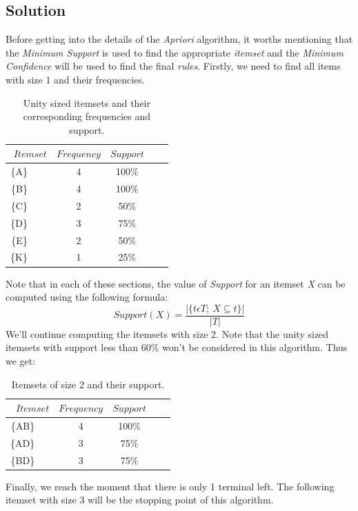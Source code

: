 \documentclass[12pt]{article}
\numberwithin{equation}{section}
\numberwithin{table}{section}
\numberwithin{figure}{section}
\begin{document}
\subsection*{Solution}
Before getting into the details of the \textit{Apriori} algorithm, it worths mentioning that the \textit{Minimum Support} is used to find the appropriate \textit{itemset} and the \textit{Minimum Confidence} will be used to find the final \textit{rules}. Firstly, we need to find all items with size 1 and their frequencies.
\begin{table}[!h] \centering
	\begin{tabular}{rcccc}
		\hline
		$ Itemset $ &
		$ Frequency $ &
		$ Support $\\
		\hline
		 \{A\}\ \ \ \ & 4 & 100\%\\ 
		 \{B\}\ \ \ \ & 4 & 100\%\\
		 \{C\}\ \ \ \  & 2 & 50\%\\
		 \{D\}\ \ \ \ & 3 & 75\%\\
		 \{E\}\ \ \ \ & 2 & 50\%\\
		 \{K\}\ \ \ \ & 1 & 25\%\\
		\hline
	\end{tabular}
	\caption{Unity sized itemsets and their corresponding frequencies and support.}
	\label{tabconvdemo}
\end{table}
Note that in each of these sections, the value of \textit{Support} for an itemset \textit{X} can be computed using the following formula:
\begin{equation}
	Support(X) = \frac{|\{t \epsilon T;\ X 	\subseteq t\}|}{|T|}
\end{equation}
We'll continue computing the itemsets with size 2. Note that the unity sized itemsets with support less than 60\% won't be considered in this algorithm. Thus we get:
\begin{table}[!h] \centering
	\begin{tabular}{rcccc}
		\hline
		$ Itemset $ &
		$ Frequency $ &
		$ Support $\\
		\hline
		 \{AB\}\ \ \ & 4 & 100\%\\ 
		 \{AD\}\ \ \ & 3 & 75\%\\
		 \{BD\}\ \ \  & 3 & 75\%\\
		\hline
	\end{tabular}
	\caption{Itemsets of size 2 and their support.}
	\label{tabconvdemo}
\end{table}
Finally, we reach the moment that there is only 1 terminal left. The following itemset with size 3 will be the stopping point of this algorithm.
\end{document}

